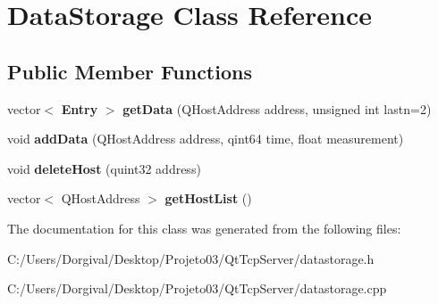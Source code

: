 \section{Data\+Storage Class Reference}
\label{class_data_storage}
\subsection*{Public Member Functions}
\begin{DoxyCompactItemize}
\item 
\mbox{\label{class_data_storage_a716fe9bd808cb8ea9f0ef153bf01a633}} 
vector$<$ \textbf{ Entry} $>$ {\bfseries get\+Data} (Q\+Host\+Address address, unsigned int lastn=2)
\item 
\mbox{\label{class_data_storage_ab46b18762db5b17b3e0a97150079cb78}} 
void {\bfseries add\+Data} (Q\+Host\+Address address, qint64 time, float measurement)
\item 
\mbox{\label{class_data_storage_a6d1d74566ca198c807a9dbbb16019472}} 
void {\bfseries delete\+Host} (quint32 address)
\item 
\mbox{\label{class_data_storage_a05e60f4e62fb68f588e3f381d40b6bbd}} 
vector$<$ Q\+Host\+Address $>$ {\bfseries get\+Host\+List} ()
\end{DoxyCompactItemize}


The documentation for this class was generated from the following files\+:\begin{DoxyCompactItemize}
\item 
C\+:/\+Users/\+Dorgival/\+Desktop/\+Projeto03/\+Qt\+Tcp\+Server/datastorage.\+h\item 
C\+:/\+Users/\+Dorgival/\+Desktop/\+Projeto03/\+Qt\+Tcp\+Server/datastorage.\+cpp\end{DoxyCompactItemize}
